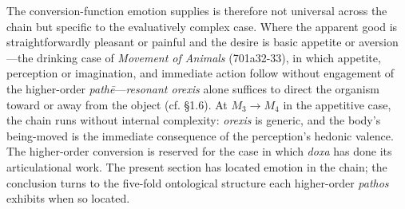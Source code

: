 The conversion-function emotion supplies is therefore not universal across the chain but specific to the evaluatively complex case. Where the apparent good is straightforwardly pleasant or painful and the desire is basic appetite or aversion---the drinking case of \textit{Movement of Animals} (701a32-33), in which appetite, perception or imagination, and immediate action follow without engagement of the higher-order \textit{pathē}---\textit{resonant orexis} alone suffices to direct the organism toward or away from the object (cf. \S 1.6). At $M_3 \rightarrow M_4$ in the appetitive case, the chain runs without internal complexity: \textit{orexis} is generic, and the body's being-moved is the immediate consequence of the perception's hedonic valence. The higher-order conversion is reserved for the case in which \textit{doxa} has done its articulational work. The present section has located emotion in the chain; the conclusion turns to the five-fold ontological structure each higher-order \textit{pathos} exhibits when so located.
